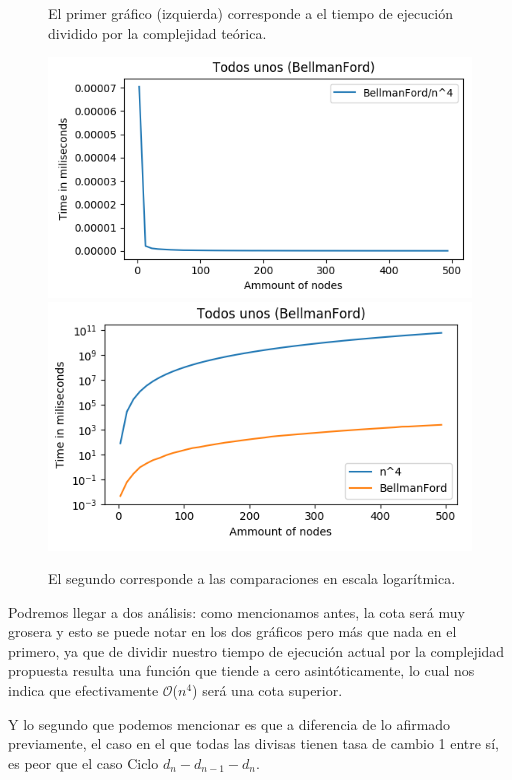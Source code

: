 \documentclass[11pt,a4paper]{article}
\begin{document}
\begin{figure}[h]
    \caption{El primer gr\'afico (izquierda) corresponde a el tiempo de ejecuci\'on dividido por la complejidad te\'orica.}
    \caption{El segundo corresponde a las comparaciones en escala logar\'itmica.}
    	\includegraphics[scale=0.6]{B-F4unos.png}
    	\includegraphics[scale=0.6]{BFlog-unos.png}
\end{figure}

Podremos llegar a dos an\'alisis: como mencionamos antes, la cota ser\'a muy grosera y esto se puede notar en los dos gr\'aficos pero m\'as que nada en el primero, ya que de dividir nuestro tiempo de ejecuci\'on actual por la complejidad propuesta resulta una funci\'on que tiende a cero asint\'oticamente, lo cual nos indica que efectivamente $\mathcal{O}$($n^{4}$) ser\'a una cota superior.

Y lo segundo que podemos mencionar es que a diferencia de lo afirmado previamente, el caso en el que todas las divisas tienen tasa de cambio 1 entre s\'i, es peor que el caso Ciclo $d_{n}-d_{n-1}-d_{n}$.
\end{document}
